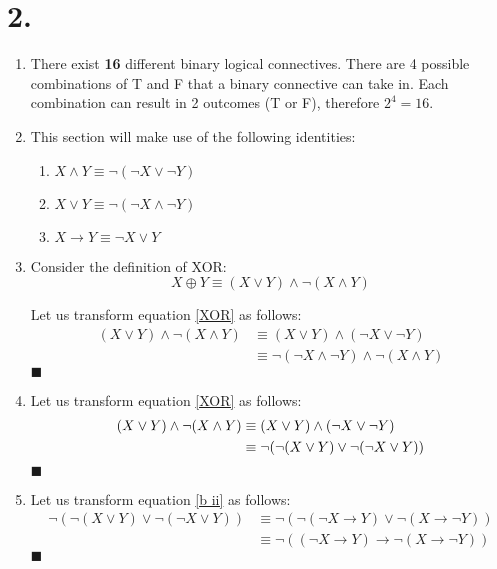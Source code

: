 \documentclass[12pt]{article}
\newcommand{\p}[1]{\item[\textnormal{(#1)}]}
\newcommand{\q}{\hfill $\blacksquare$}
\newenvironment{ps}
{\begin{enumerate}[leftmargin=0em, itemindent=1.5em]}
{\end{enumerate}}
\begin{document}
\section*{2.}
\begin{ps}

    \p{a} There exist \textbf{16} different binary logical connectives. There are
    4 possible combinations of T and F that a binary connective can take in. Each
    combination can result in 2 outcomes (T or F), therefore \(2^4 = 16\).

    \p{b} This section will make use of the following identities:

        \begin{enumerate}[label=\arabic*.]
            \item \( X \wedge Y \equiv \neg(\neg X \vee \neg Y) \)
            \item \( X \vee Y \equiv \neg(\neg X \wedge \neg Y) \)
            \item \( X \rightarrow Y \equiv \neg X \vee Y \)
        \end{enumerate}

    \p{i} Consider the definition of XOR: 
        \begin{equation}
            \label{XOR}
            X \oplus Y \equiv (X \vee Y) \wedge \neg(X \wedge Y)
        \end{equation}

        Let us transform equation \eqref{XOR} as follows:
        \begin{align*}
            (X \vee Y) \wedge \neg(X \wedge Y) &\equiv (X \vee Y) \wedge (\neg X \vee \neg Y) \\
                                               &\equiv \neg(\neg X \wedge \neg Y) \wedge \neg (X
                                               \wedge Y)
        \end{align*} \q

    \p{ii} Let us transform equation \eqref{XOR} as follows: 
        \begin{align}
            \label{b ii}
            (X \vee Y) \wedge \neg(X \wedge Y) &\equiv (X \vee Y) \wedge (\neg X \vee \neg Y) \notag \\
                                               &\equiv \neg (\neg (X \vee Y) \vee \neg (\neg X
                                               \vee Y ))
        \end{align} \q

    \p{iii} Let us transform equation \eqref{b ii} as follows: 
        \begin{align*}
            \neg (\neg (X \vee Y) \vee \neg (\neg X \vee Y )) &\equiv \neg(\neg(\neg X \rightarrow
            Y) \vee \neg(X \rightarrow \neg Y)) \\
            &\equiv \neg ((\neg X \rightarrow Y) \rightarrow \neg (X \rightarrow \neg Y))
        \end{align*} \q


\end{ps}
\end{document}
